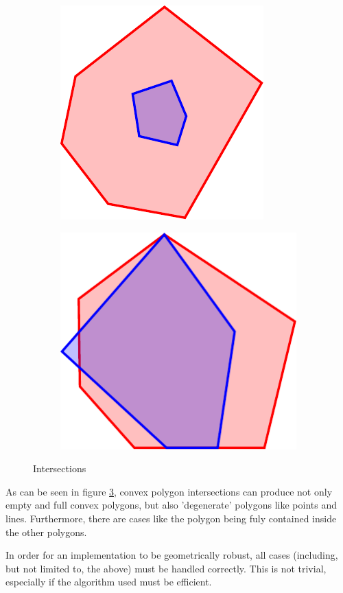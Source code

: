 \begin{figure}[p]
\begin{subfigure}[b]{0.3\linewidth}
	  \includegraphics[scale=0.5]{intersections/intersection_inside.pdf}
	  \label{fig:intersection_inside}
	\end{subfigure}
	\begin{subfigure}[b]{0.3\linewidth}
	  \centering
	  \includegraphics[scale=0.5]{intersections/intersection_fun.pdf}
	  \label{fig:intersection_fun}
	\end{subfigure}
\caption{Intersections}
\label{fig:intersections}
\end{figure}

As can be seen in figure \ref{fig:intersections}, convex polygon intersections can produce not only empty
and full convex polygons, but also 'degenerate' polygons like points and lines.
Furthermore, there are cases like the polygon being fuly contained inside the
other polygons.

In order for an implementation to be geometrically robust,
all cases (including, but not limited to, the above) must be handled correctly.
This is not trivial, especially if the algorithm used must be efficient.

